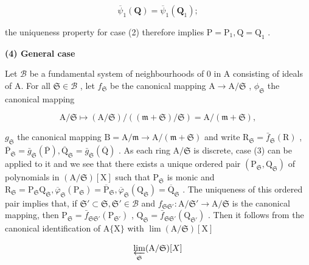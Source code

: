 \[
\overline {{{{\psi}}}} _ {1} (\mathbf {Q}) = \overline {{{{\psi}}}} _ {1} (\mathbf {Q} _ {1});
\]

the uniqueness property for case (2) therefore implies \(\mathrm{P} = \mathrm{P}_1, \mathrm{Q} = \mathrm{Q}_1\) .

\textbf{(4) General case}\par

Let \(\mathcal{B}\) be a fundamental system of neighbourhoods of 0 in A consisting of ideals of A. For all \(\mathfrak{S} \in \mathcal{B}\) , let \(f_{\mathfrak{S}}\) be the canonical mapping \(\mathrm{A} \to \mathrm{A} / \mathfrak{S}\) , \(\phi_{\mathfrak{S}}\) the canonical mapping

\[
\mathrm{A} / \mathfrak{S} \mapsto (\mathrm{A} / \mathfrak{S}) / ((\mathfrak {m} + \mathfrak{S}) / \mathfrak{S}) = \mathrm{A} / (\mathfrak {m} + \mathfrak{S}),
\]

\(g_{\mathfrak{S}}\) the canonical mapping \(\mathrm{B} = \mathrm{A} / \mathfrak{m}\to \mathrm{A} /(\mathfrak{m} + \mathfrak{S})\) and write \(\mathrm{R}_{\mathfrak{S}} = \bar{f}_{\mathfrak{S}}(\mathrm{R})\) , \(\overline{\mathrm{P}}_{\mathfrak{S}} = \bar{g}_{\mathfrak{S}}(\overline{\mathrm{P}}),\overline{\mathrm{Q}}_{\mathfrak{S}} = \bar{g}_{\mathfrak{S}}(\overline{\mathrm{Q}})\) . As each ring \(\mathrm{A} / \mathfrak{S}\) is discrete, case (3) can be applied to it and we see that there exists a unique ordered pair \((\mathrm{P}_{\mathfrak{S}},\mathrm{Q}_{\mathfrak{S}})\) of polynomials in \((\mathrm{A} / \mathfrak{S})[\mathrm{X}]\) such that \(\mathrm{P}_{\mathfrak{S}}\) is monic and \(\mathrm{R}_{\mathfrak{S}} = \mathrm{P}_{\mathfrak{S}}\mathrm{Q}_{\mathfrak{S}},\overline{\varphi}_{\mathfrak{S}}(\mathrm{P}_{\mathfrak{S}}) = \overline{\mathrm{P}}_{\mathfrak{S}},\overline{\varphi}_{\mathfrak{S}}(\mathrm{Q}_{\mathfrak{S}}) = \overline{\mathrm{Q}}_{\mathfrak{S}}\) . The uniqueness of this ordered pair implies that, if \(\mathfrak{S}'\subset \mathfrak{S},\mathfrak{S}'\in \mathcal{B}\) and \(f_{\mathfrak{S}\mathfrak{S}'}:\mathrm{A} / \mathfrak{S}'\rightarrow \mathrm{A} / \mathfrak{S}\) is the canonical mapping, then \(\mathrm{P}_{\mathfrak{S}} = \bar{f}_{\mathfrak{S}\mathfrak{S}'}(\mathrm{P}_{\mathfrak{S}'})\) , \(\mathrm{Q}_{\mathfrak{S}} = \bar{f}_{\mathfrak{S}\mathfrak{S}'}(\mathrm{Q}_{\mathfrak{S}'})\) . Then it follows from the canonical identification of \(\mathrm{A}\{\mathrm{X}\}\) with \(\lim (\mathrm{A} /\mathfrak{S})[\mathrm{X}]\)

\[
\varprojlim_ {\mathfrak {S}} (\mathrm{A} / \mathfrak {S}) [ X ]
\]

